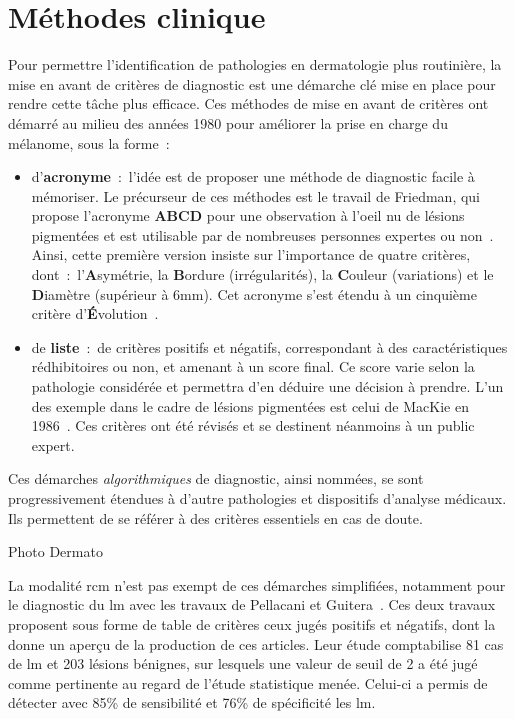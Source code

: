 \section{Méthodes clinique}
\label{sec:clinical_methods}
Pour permettre l'identification de pathologies en dermatologie plus routinière, la mise en avant de critères de diagnostic est une démarche clé mise en place pour rendre cette tâche plus efficace. Ces méthodes de mise en avant de critères ont démarré au milieu des années 1980 pour améliorer la prise en charge du mélanome, sous la forme~:
\begin{itemize}
    \item d'\textbf{acronyme}~:~l'idée est de proposer une méthode de diagnostic facile à mémoriser. Le précurseur de ces méthodes est le travail de Friedman, qui propose l'acronyme \textbf{ABCD} pour une observation à l'oeil nu de lésions pigmentées et est utilisable par de nombreuses personnes expertes ou non~\cite{Friedman1985}. Ainsi, cette première version insiste sur l'importance de quatre critères, dont~:~l'\textbf{A}symétrie, la \textbf{B}ordure (irrégularités), la \textbf{C}ouleur (variations) et le \textbf{D}iamètre (supérieur à 6mm). Cet acronyme s'est étendu à un cinquième critère d'\textbf{É}volution~\cite{Abbasi2004}.
    \item de \textbf{liste}~:~de critères positifs et négatifs, correspondant à des caractéristiques rédhibitoires ou non, et amenant à un score final. Ce score varie selon la pathologie considérée et permettra d'en déduire une décision à prendre. L'un des exemple dans le cadre de lésions pigmentées est celui de MacKie en 1986~\cite{mackie1986}. Ces critères ont été révisés et se destinent néanmoins à un public expert. 
\end{itemize}\par

Ces démarches \textit{algorithmiques} de diagnostic, ainsi nommées, se sont progressivement étendues à d'autre pathologies et dispositifs d'analyse médicaux. Ils permettent de se référer à des critères essentiels en cas de doute.

Photo
Dermato

La modalité \gls{rcm} n'est pas exempt de ces démarches simplifiées, notamment pour le diagnostic du \gls{lm} avec les travaux de Pellacani et Guitera~\cite{Pellacani2007, Guitera2010}. Ces deux travaux proposent sous forme de table de critères ceux jugés positifs et négatifs, dont la  donne un aperçu de la production de ces articles. Leur étude comptabilise 81 cas de \gls{lm} et 203 lésions bénignes, sur lesquels une valeur de seuil de 2 a été jugé comme pertinente au regard de l'étude statistique menée. Celui-ci a permis de détecter avec 85\% de sensibilité et 76\% de spécificité les \gls{lm}.\par

